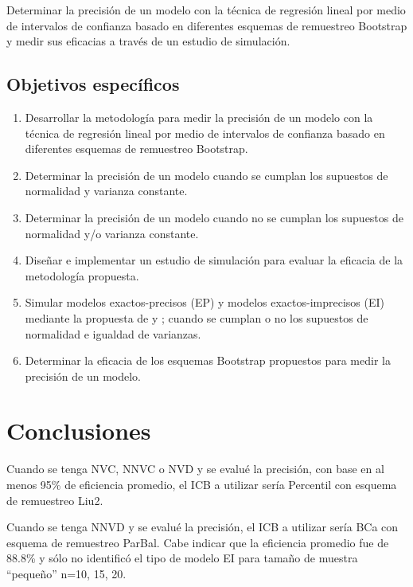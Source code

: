 
Determinar la precisión de un modelo con la técnica de regresión lineal por medio de intervalos de confianza basado en diferentes esquemas de remuestreo Bootstrap y medir sus eficacias a través de un estudio de simulación.
\vspace{.5cm}
\subsection{Objetivos específicos}
\begin{enumerate}
	\item Desarrollar la metodología para medir la precisión de un modelo con la técnica de regresión lineal por medio de intervalos de confianza basado en diferentes esquemas de remuestreo Bootstrap.
	\item Determinar la precisión de un modelo cuando se cumplan los supuestos de normalidad y varianza constante.
	\item Determinar la precisión de un modelo cuando no se cumplan los supuestos de normalidad y/o varianza constante.
	\item Diseñar e implementar un estudio de simulación para evaluar la eficacia de la metodología propuesta.
	\item Simular modelos exactos-precisos (EP) y modelos exactos-imprecisos (EI) mediante la propuesta de \textcite{febles-2014} y \textcite{zacarias-2023}; cuando se cumplan o no los supuestos de normalidad e igualdad de varianzas.
	\item Determinar la eficacia de los esquemas Bootstrap propuestos para medir la precisión de un modelo.
\end{enumerate}



\section{Conclusiones}


Cuando se tenga NVC, NNVC o NVD y se evalué la precisión, con base en al menos 95\% de eficiencia promedio, el ICB a utilizar sería Percentil con esquema de remuestreo Liu2.

Cuando se tenga NNVD y se evalué la precisión, el ICB a utilizar sería BCa con esquema de remuestreo ParBal. Cabe indicar que la eficiencia promedio fue de 88.8\% y sólo no identificó el tipo de modelo EI para tamaño de muestra “pequeño” n=10, 15, 20.